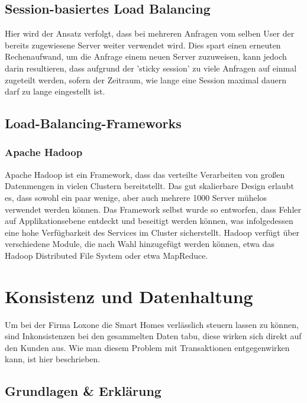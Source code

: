 \documentclass[letterpaper, 12pt]{article}
\let\tempsection\section
\renewcommand\section[1]{\vspace{-0.3cm}\tempsection{#1}\vspace{-0.3cm}}
\let\tempsubsection\subsection
\renewcommand\subsection[1]{\vspace{0cm}\tempsubsection{#1}\vspace{0cm}}
\let\tempsubsubsection\subsubsection
\renewcommand\subsubsection[1]{\vspace{0cm}\tempsubsubsection{#1}\vspace{0cm}}
\begin{document}
\subsection{Session-basiertes Load Balancing}

Hier wird der Ansatz verfolgt, dass bei mehreren Anfragen vom selben User der bereits zugewiesene Server weiter verwendet wird. Dies spart einen erneuten Rechenaufwand, um die Anfrage einem neuen Server zuzuweisen, kann jedoch darin resultieren, dass aufgrund der 'sticky session' zu viele Anfragen auf einmal zugeteilt werden, sofern der Zeitraum, wie lange eine Session maximal dauern darf zu lange eingestellt ist. \cite{ausarbeitunglb}

\subsection{Load-Balancing-Frameworks}

\subsubsection{Apache Hadoop}

Apache Hadoop ist ein Framework, dass das verteilte Verarbeiten von großen Datenmengen in vielen Clustern bereitstellt. Das gut skalierbare Design erlaubt es, dass sowohl ein paar wenige,
aber auch mehrere 1000 Server mühelos verwendet werden können. Das Framework selbst wurde so
entworfen, dass Fehler auf Applikationsebene entdeckt und beseitigt werden können, was infolgedessen
eine hohe Verfügbarkeit des Services im Cluster sicherstellt. Hadoop verfügt über verschiedene Module, die nach Wahl hinzugefügt werden können, etwa das Hadoop Distributed File System oder etwa MapReduce. \cite{ausarbeitunglb}

\clearpage

\section{Konsistenz und Datenhaltung}

Um bei der Firma Loxone die Smart Homes verlässlich steuern lassen zu können, sind Inkonsistenzen bei den gesammelten Daten tabu, diese wirken sich direkt auf den Kunden aus. Wie man diesem Problem mit Transaktionen entgegenwirken kann, ist hier beschrieben.

\subsection{Grundlagen \& Erklärung}
\end{document}
